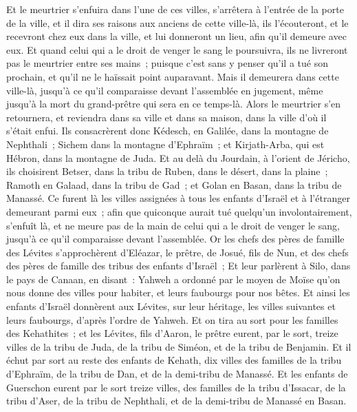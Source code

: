 \begin{multicols}{2}
Et le meurtrier s'enfuira dans l'une de ces villes, s'arrêtera à l'entrée de la porte de la ville, et il dira ses raisons aux anciens de cette ville-là, ils l'écouteront, et le recevront chez eux dans la ville, et lui donneront un lieu, afin qu'il demeure avec eux.
Et quand celui qui a le droit de venger le sang le poursuivra, ils ne livreront pas le meurtrier entre ses mains~; puisque c'est sans y penser qu'il a tué son prochain, et qu'il ne le haïssait point auparavant.
Mais il demeurera dans cette ville-là, jusqu'à ce qu'il comparaisse devant l'assemblée en jugement, même jusqu'à la mort du grand-prêtre qui sera en ce temps-là. Alors le meurtrier s'en retournera, et reviendra dans sa ville et dans sa maison, dans la ville d'où il s'était enfui.
Ils consacrèrent donc Kédesch, en Galilée, dans la montagne de Nephthali~; Sichem dans la montagne d'Ephraïm~; et Kirjath-Arba, qui est Hébron, dans la montagne de Juda.
Et au delà du Jourdain, à l'orient de Jéricho, ils choisirent Betser, dans la tribu de Ruben, dans le désert, dans la plaine~; Ramoth en Galaad, dans la tribu de Gad~; et Golan en Basan, dans la tribu de Manassé.
Ce furent là les villes assignées à tous les enfants d'Israël et à l'étranger demeurant parmi eux~; afin que quiconque aurait tué quelqu'un involontairement, s'enfuît là, et ne meure pas de la main de celui qui a le droit de venger le sang, jusqu'à ce qu'il comparaisse devant l'assemblée.
\VerseOne{}Or les chefs des pères de famille des Lévites s'approchèrent d'Eléazar, le prêtre, de Josué, fils de Nun, et des chefs des pères de famille des tribus des enfants d'Israël~;
Et leur parlèrent à Silo, dans le pays de Canaan, en disant~: Yahweh a ordonné par le moyen de Moïse qu'on nous donne des villes pour habiter, et leurs faubourgs pour nos bêtes.
Et ainsi les enfants d'Israël donnèrent aux Lévites, sur leur héritage, les villes suivantes et leurs faubourgs, d'après l'ordre de Yahweh.
Et on tira au sort pour les familles des Kehathites~; et les Lévites, fils d'Aaron, le prêtre eurent, par le sort, treize villes de la tribu de Juda, de la tribu de Siméon, et de la tribu de Benjamin.
Et il échut par sort au reste des enfants de Kehath, dix villes des familles de la tribu d'Ephraïm, de la tribu de Dan, et de la demi-tribu de Manassé.
Et les enfants de Guerschon eurent par le sort treize villes, des familles de la tribu d'Issacar, de la tribu d'Aser, de la tribu de Nephthali, et de la demi-tribu de Manassé en Basan.

\end{multicols}
